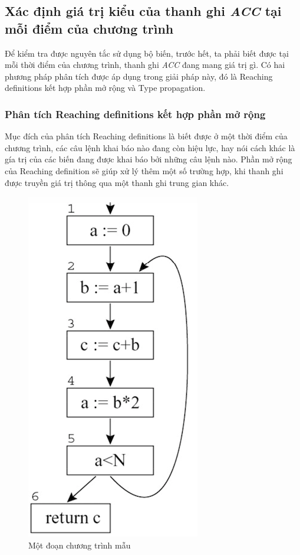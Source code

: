 \subsection{Xác định giá trị kiểu của thanh ghi \textit{ACC} tại mỗi điểm của chương trình}
Để kiểm tra được nguyên tắc sử dụng bộ biến, trước hết, ta phải biết được tại mỗi thời điểm của chương trình, thanh ghi \textit{ACC} đang mang giá trị gì. Có hai phương pháp phân tích được áp dụng trong giải pháp này, đó là Reaching definitions kết hợp phần mở rộng và Type propagation.
\subsubsection{Phân tích Reaching definitions kết hợp phần mở rộng}
Mục đích của phân tích Reaching definitions là biết được ở một thời điểm của chương trình, các câu lệnh khai báo nào đang còn hiệu lực, hay nói cách khác là gía trị của các biến đang được khai báo bởi những câu lệnh nào. Phần mở rộng của Reaching definition sẽ giúp xử lý thêm một số trường hợp, khi thanh ghi được truyền giá trị thông qua một thanh ghi trung gian khác.
\begin{figure}
	\centering
	\includegraphics[scale=0.75]{image/reachingDefExam}
	\caption{Một đoạn chương trình mẫu}
	\label{fig:reachingdefexam}
\end{figure}
